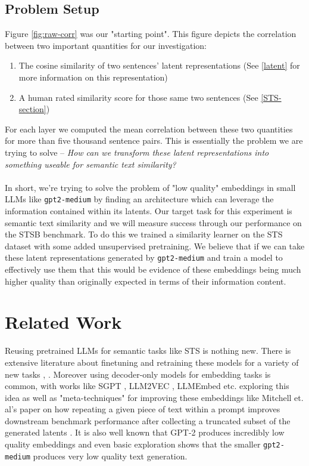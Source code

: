 \documentclass[14pt]{article}
\begin{document}
\subsection{Problem Setup} \label{Setup}
Figure \ref{fig:raw-corr} was our "starting point". This figure depicts the correlation between two important quantities for our investigation:
\begin{enumerate}
    \item The cosine similarity of two sentences' latent representations (See \ref{latent} for more information on this representation)
    \item A human rated similarity score for those same two sentences (See \ref{STS-section})
\end{enumerate}
For each layer we computed the mean correlation between these two quantities for more than five thousand sentence pairs. This is essentially the problem we are trying to solve -- \textit{How can we transform these latent representations into something useable for semantic text similarity?}\\\\
In short, we're trying to solve the problem of "low quality" embeddings in small LLMs like \verb|gpt2-medium| by finding an architecture which can leverage the information contained within its latents. Our target task for this experiment is semantic text similarity and we will measure success through our performance on the STSB \cite{STS} benchmark. To do this we trained a similarity learner on the STS dataset with some added unsupervised pretraining. We believe that if we can take these latent representations generated by \verb|gpt2-medium| and train a model to effectively use them that this would be evidence of these embeddings being much higher quality than originally expected in terms of their information content.

\section{Related Work}
Reusing pretrained LLMs for semantic tasks like STS is nothing new. There is extensive literature about finetuning and retraining
these models for a variety of new tasks \cite{reimers2019sentencebertsentenceembeddingsusing}, \cite{tang2024poolingattentioneffectivedesigns}. Moreover using decoder-only models for embedding tasks is common, with works like
SGPT \cite{muennighoff2022sgptgptsentenceembeddings}, LLM2VEC \cite{LLM2Vec}, LLMEmbed \cite{LLMEmbed} etc. exploring this idea as well as "meta-techniques" for improving these embeddings like Mitchell et. al's paper on how repeating a given piece of text within a prompt improves downstream benchmark performance after collecting a truncated subset of the generated latents \cite{RepImprovesLLM}. It is also well known that GPT-2 produces incredibly low quality embeddings \cite{ethayarajh2019contextualcontextualizedwordrepresentations} and even basic exploration shows that the smaller \verb|gpt2-medium| produces very low quality text generation.
\end{document}
